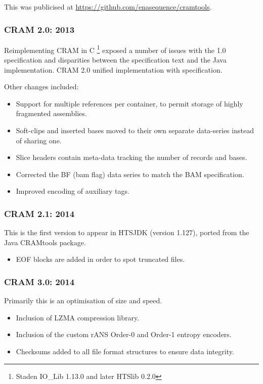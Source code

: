 \documentclass[a4paper]{article}
\begin{document}
This was publicised at \url{https://github.com/enasequence/cramtools}.

\subsubsection*{CRAM 2.0: 2013}

Reimplementing CRAM in C
\footnote{Staden IO\_Lib 1.13.0 and later HTSlib 0.2.0} exposed a number of issues with the
1.0 specification and disparities between the specification text and
the Java implementation.  CRAM 2.0 unified implementation with
specification.

Other changes included:

\begin{itemize}
\item Support for multiple references per container, to permit storage
of highly fragmented assemblies.

\item Soft-clips and inserted bases moved to their own separate
data-series instead of sharing one.

\item Slice headers contain meta-data tracking the number of records
and bases.

\item Corrected the BF (bam flag) data series to match the BAM
specification.

\item Improved encoding of auxiliary tags.
\end{itemize}

\subsubsection*{CRAM 2.1: 2014}

This is the first version to appear in HTSJDK (version 1.127), ported
from the Java CRAMtools package.

\begin{itemize}
\item EOF blocks are added in order to spot truncated files.
\end{itemize}

\subsubsection*{CRAM 3.0: 2014}

Primarily this is an optimisation of size and speed.

\begin{itemize}
\item Inclusion of LZMA compression library.
\item Inclusion of the custom rANS Order-0 and Order-1 entropy encoders.
\item Checksums added to all file format structures to ensure data integrity.
\end{itemize}
\end{document}
